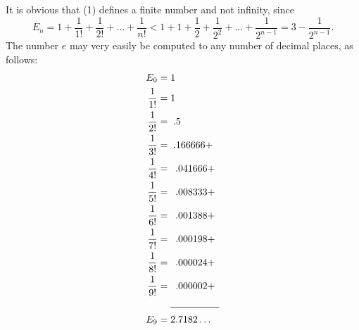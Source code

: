 \documentclass[a4paper,12pt]{book}[2004/02/16]
\providecommand{\hyperlink}[2]{#2}
\theoremstyle{ilemma}
\theoremstyle{itheorem}
\theoremstyle{iother}
\theoremstyle{icorollary}
\theoremstyle{numcorollary}
\theoremstyle{idefinition}
\begin{document}
It is obvious that \hyperlink{eq1p16}{(1)} defines a finite number and not infinity,
since
\[
  E_n=1+\frac{1}{1!}+\frac{1}{2!}+ \ldots + \frac{1}{n!}
  < 1+1+\frac12+\frac{1}{2^2}+ \ldots +\frac{1}{2^{n-1}}
  = 3-\frac{1}{2^{n-1}}.
\]
The number $e$ may very easily be computed to any number of decimal
places, as follows:
\begin{align*}
         E_0 &= 1 \\
\frac{1}{1!} &= 1 \\
\frac{1}{2!} &= \;.5 \\
\frac{1}{3!} &= \;.166666+\\
\frac{1}{4!} &=\phantom{1}.041666+ \\
\frac{1}{5!} &=\phantom{1}.008333+ \\
\frac{1}{6!} &=\phantom{1}.001388+ \\
\frac{1}{7!} &=\phantom{1}.000198+ \\
\frac{1}{8!} &=\phantom{1}.000024+ \\
\frac{1}{9!} &=\phantom{1}.000002+ \\
             &\quad\ \rule{5em}{0.5pt}\\
E_9 &= 2.7182\ldots
\end{align*}
\end{document}
